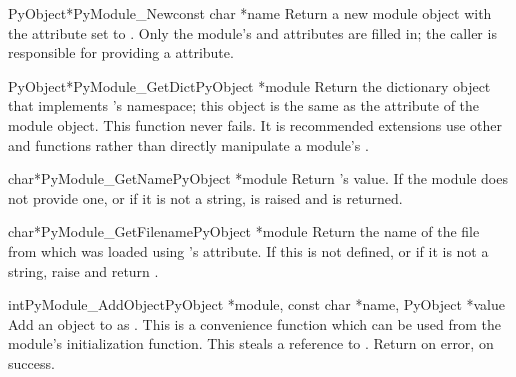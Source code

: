 \begin{cfuncdesc}{PyObject*}{PyModule_New}{const char *name}
  Return a new module object with the  attribute set
  to .  Only the module's  and
   attributes are filled in; the caller is
  responsible for providing a  attribute.
\end{cfuncdesc}

\begin{cfuncdesc}{PyObject*}{PyModule_GetDict}{PyObject *module}
  Return the dictionary object that implements 's
  namespace; this object is the same as the 
  attribute of the module object.  This function never fails.
  It is recommended extensions use other 
  and  functions rather than directly
  manipulate a module's .
\end{cfuncdesc}

\begin{cfuncdesc}{char*}{PyModule_GetName}{PyObject *module}
  Return 's  value.  If the module does
  not provide one, or if it is not a string, 
  is raised and \NULL{} is returned.
\end{cfuncdesc}

\begin{cfuncdesc}{char*}{PyModule_GetFilename}{PyObject *module}
  Return the name of the file from which  was loaded using
  's  attribute.  If this is not defined,
  or if it is not a string, raise  and return
  \NULL{}.
\end{cfuncdesc}

\begin{cfuncdesc}{int}{PyModule_AddObject}{PyObject *module,
                                           const char *name, PyObject *value}
  Add an object to  as .  This is a convenience
  function which can be used from the module's initialization
  function.  This steals a reference to .  Return
   on error,  on success.
\end{cfuncdesc}

